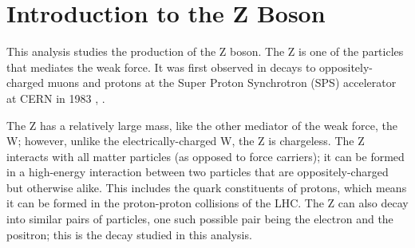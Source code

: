 


\section{Introduction to the Z Boson}
This analysis studies the production of the Z boson.  
The Z is one of the particles that mediates the weak force. %
It was %
first observed %
in 
decays to oppositely-charged muons and protons 
at the 
Super Proton Synchrotron (SPS) accelerator at CERN in 1983 
\cite{Z-ua1}, \cite{Z-ua2}.  

The Z has a relatively large mass, 
like the other mediator of the weak force, the W; 
however, unlike the electrically-charged W, the Z is chargeless.  
The Z interacts with all matter particles (as opposed to force carriers); 
it can be formed in a high-energy interaction between 
two particles that are oppositely-charged but otherwise alike.  
This includes the quark constituents of protons, 
which means it can be formed in the proton-proton collisions 
of the LHC.  
The Z can also decay into similar pairs of particles, 
one such possible pair being the electron and the positron; 
this is the decay studied in this analysis.  

